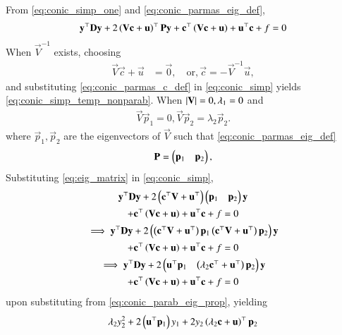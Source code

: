 \begin{enumerate}[label=\thesubsection.\arabic*.,ref=\thesubsection.\theenumi]
%
From \eqref{eq:conic_simp_one} and \eqref{eq:conic_parmas_eig_def},
\begin{align}
\mathbf{y}^{\top}\mathbf{D}\mathbf{y}+2\left(\mathbf{V}\mathbf{c}+\mathbf{u}\right)^{\top}\mathbf{P}\mathbf{y}
+  \mathbf{c}^{\top}\left(\mathbf{V}\mathbf{c} + \mathbf{u}\right)+ \mathbf{u}^{\top}\mathbf{c} + f= 0
\label{eq:conic_simp}
\end{align}
When $\vec{V}^{-1}$ exists, choosing
\begin{align}
\vec{V}\vec{c}+\vec{u} &= \vec{0}, \quad \text{or}, \vec{c} = -\vec{V}^{-1}\vec{u},
\label{eq:conic_parmas_c_def}
\end{align}
%
and substituting \eqref{eq:conic_parmas_c_def}
in \eqref{eq:conic_simp}
yields \eqref{eq:conic_simp_temp_nonparab}. 
When $\left\vert\mathbf{V}\right\vert = 0, \lambda_1 = 0$ and 
\begin{align}
\vec{V}\vec{p}_1 = 0, 
\vec{V}\vec{p}_2 = \lambda_2\vec{p}_2.
\label{eq:conic_parab_eig_prop} 
\end{align}
where $\vec{p}_1,\vec{p}_2$ are the eigenvectors of $\vec{V}$ such that  \eqref{eq:conic_parmas_eig_def}
%
\begin{align}
\mathbf{P} = \begin{pmatrix}\mathbf{p}_1 & \mathbf{p}_2\end{pmatrix},
\label{eq:eig_matrix}
\end{align}
Substituting \eqref{eq:eig_matrix}
in \eqref{eq:conic_simp},
\begin{multline}
	\mathbf{y}^{\top}\mathbf{D}\mathbf{y}+2\left(\mathbf{c}^{\top}\mathbf{V}+\mathbf{u}^{\top}\right)\begin{pmatrix}\mathbf{p}_1 & \mathbf{p}_2\end{pmatrix}\mathbf{y}
	\\
	+  \mathbf{c}^{\top}\left(\mathbf{V}\mathbf{c} + \mathbf{u}\right)+ \mathbf{u}^{\top}\mathbf{c} + f= 0
\\
\implies \mathbf{y}^{\top}\mathbf{D}\mathbf{y}
+2\begin{pmatrix}\left(\mathbf{c}^{\top}\mathbf{V}+\mathbf{u}^{\top}\right)\mathbf{p}_1  \left(\mathbf{c}^{\top}\mathbf{V}+\mathbf{u}^{\top}\right)\mathbf{p}_2\end{pmatrix}\mathbf{y}
\\
	+  \mathbf{c}^{\top}\left(\mathbf{V}\mathbf{c} + \mathbf{u}\right)+ \mathbf{u}^{\top}\mathbf{c} + f= 0
\\
\implies \mathbf{y}^{\top}\mathbf{D}\mathbf{y}
+2\begin{pmatrix}\mathbf{u}^{\top}\mathbf{p}_1 & \left(\lambda_2\mathbf{c}^{\top}+\mathbf{u}^{\top}\right)\mathbf{p}_2\end{pmatrix}\mathbf{y}
\\
	+  \mathbf{c}^{\top}\left(\mathbf{V}\mathbf{c} + \mathbf{u}\right)+ \mathbf{u}^{\top}\mathbf{c} + f= 0
\end{multline}
upon substituting from 
 \eqref{eq:conic_parab_eig_prop}, yielding
\begin{multline}
\lambda_2y_2^2+2\brak{\vec{u}^{\top}\vec{p}_1}y_1+  2y_2\brak{\lambda_2\vec{c}+\vec{u}}^{\top}\vec{p}_2

\end{multline}
\end{enumerate}
